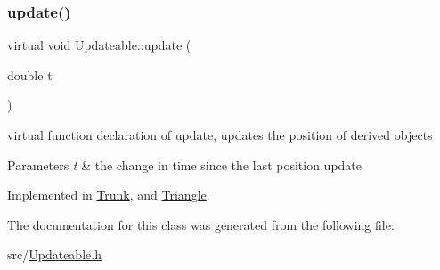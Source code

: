 \subsubsection{\texorpdfstring{update()}{update()}}
{\footnotesize\ttfamily virtual void Updateable\+::update (\begin{DoxyParamCaption}\item[{double}]{t }\end{DoxyParamCaption})\hspace{0.3cm}{\ttfamily [pure virtual]}}



virtual function declaration of update, updates the position of derived objects 


\begin{DoxyParams}{Parameters}
{\em t} & the change in time since the last position update \\
\hline
\end{DoxyParams}


Implemented in \mbox{\hyperlink{class_trunk_ab62c99b7a3ad20b53d81b87afa91d28d}{Trunk}}, and \mbox{\hyperlink{class_triangle_a38658aaef09315379d75dd9a36456c0e}{Triangle}}.



The documentation for this class was generated from the following file\+:\begin{DoxyCompactItemize}
\item 
src/\mbox{\hyperlink{_updateable_8h}{Updateable.\+h}}\end{DoxyCompactItemize}
